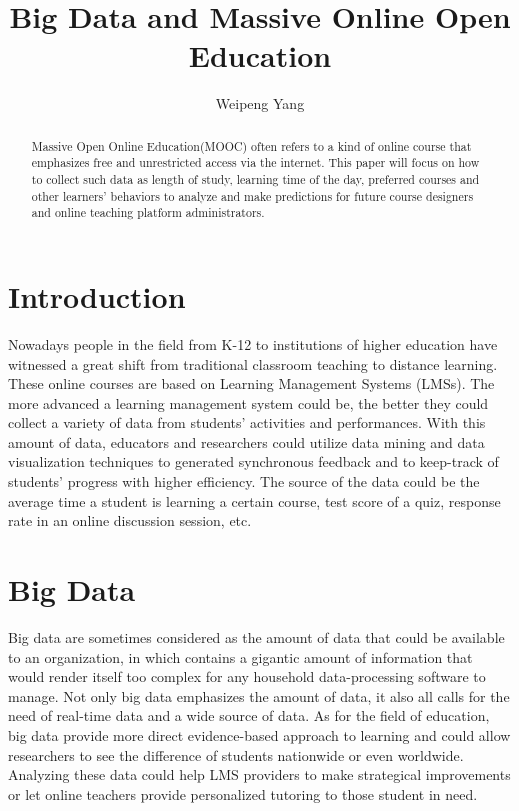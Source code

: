 \documentclass[sigconf]{acmart}
\begin{document}
\title{Big Data and Massive Online Open Education}

\author{Weipeng Yang}



\begin{abstract}
Massive Open Online Education(MOOC) often refers to a kind of online course that emphasizes free and unrestricted access via the internet. This paper will focus on how to collect such data as length of study, learning time of the day, preferred courses and other learners' behaviors to analyze and make predictions for future course designers and online teaching platform administrators.
\end{abstract}


\maketitle

\section{Introduction}

Nowadays people in the field from K-12 to institutions of higher education have witnessed a great shift from traditional classroom teaching to distance learning. These online courses are based on Learning Management Systems (LMSs). The more advanced a learning management system could be, the better they could collect a variety of data from students’ activities and performances. With this amount of data, educators and researchers could utilize data mining and data visualization techniques to generated synchronous feedback and to keep-track of students’ progress with higher efficiency. The source of the data could be the average time a student is learning a certain course, test score of a quiz, response rate in an online discussion session, etc.

\section{Big Data}
Big data are sometimes considered as the amount of data that could be available to an organization, in which contains a gigantic amount of information that would render itself too complex for any household data-processing software to manage. Not only big data emphasizes the amount of data, it also all calls for the need of real-time data and a wide source of data. As for the field of education, big data provide more direct evidence-based approach to learning and could allow researchers to see the difference of students nationwide or even worldwide. Analyzing these data could help LMS providers to make strategical improvements or let online teachers provide personalized tutoring to those student in need.
\end{document}
